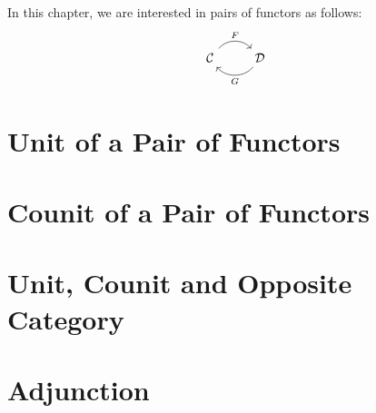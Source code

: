 In this chapter, we are interested in pairs of functors as follows:
    \[
        \begin{tikzcd}
              \Cat \arrow[r, "F", bend left  = 50, ""{name=U, below}]
            & \Dat \arrow[l, "G", bend left = 50, ""{name=D, above}]
        \end{tikzcd}
    \]
\section{Unit of a Pair of Functors}
    
\section{Counit of a Pair of Functors}
    
\section{Unit, Counit and Opposite Category}
    
\section{Adjunction}
    
